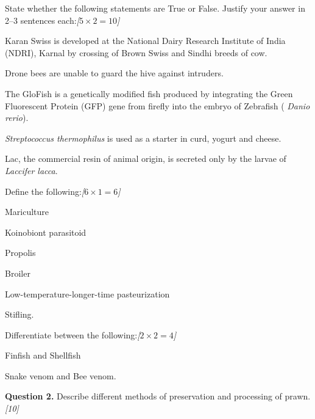 \documentclass[11pt,a4paper]{article}
\newcommand{\pts}[1]{\hfill   \textit{[#1]}}
\begin{document}
\begin{parts}
  \item State whether the following statements are True or False. Justify your answer in 2--3 sentences each:\pts{$5  \times 2 = 10$}
  
\begin{parts}
    \item Karan Swiss is developed at the National Dairy Research Institute of India (NDRI), Karnal by crossing of Brown Swiss and Sindhi breeds of cow.
    \item Drone bees are unable to guard the hive against intruders.
    \item The GloFish is a genetically modified fish produced by integrating the Green Fluorescent Protein (GFP) gene from firefly into the embryo of Zebrafish (   \textit{Danio rerio}).
    \item   \textit{Streptococcus thermophilus} is used as a starter in curd, yogurt and cheese.
    \item Lac, the commercial resin of animal origin, is secreted only by the larvae of   \textit{Laccifer lacca}.
  \end{parts}

  \item Define the following:\pts{$6  \times 1 = 6$}
  
\begin{parts}
    \item Mariculture
    \item Koinobiont parasitoid
    \item Propolis
    \item Broiler
    \item Low-temperature-longer-time pasteurization
    \item Stifling.
  \end{parts}

  \item Differentiate between the following:\pts{$2  \times 2 = 4$}
  
\begin{parts}
    \item Finfish and Shellfish
    \item Snake venom and Bee venom.
  \end{parts}
\end{parts}

\medskip


\noindent   \textbf{Question 2.} Describe different methods of preservation and processing of prawn.\pts{10}
\end{document}
